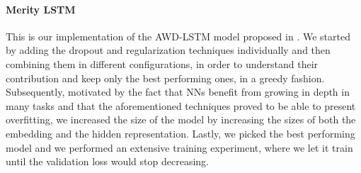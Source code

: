 \paragraph*{Merity LSTM}
This is our implementation of the AWD-LSTM model proposed in \cite{merity2017regularizing}. We started by adding the dropout and regularization techniques individually and then combining them in different configurations, in order to understand their contribution and keep only the best performing ones, in a greedy fashion. Subsequently, motivated by the fact that NNs benefit from growing in depth in many tasks and that the aforementioned techniques proved to be able to present overfitting, we increased the size of the model by increasing the sizes of both the embedding and the hidden representation. Lastly, we picked the best performing model and we performed an extensive training experiment, where we let it train until the validation loss would stop decreasing.